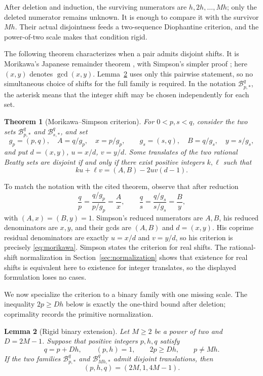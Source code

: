 \documentclass[11pt]{article}
\newtheorem{theorem}{Theorem}[section]
\newtheorem{lemma}[theorem]{Lemma}
\theoremstyle{definition}
\theoremstyle{remark}
\newcommand{\B}{\mathcal B}
\begin{document}
After deletion and induction, the surviving numerators are
\(h,2h,\ldots,Mh\); only the deleted numerator remains unknown.  It is
enough to compare it with the survivor \(Mh\).  Their actual disjointness
feeds a two-sequence Diophantine criterion, and the power-of-two scale makes
that condition rigid.

The following theorem characterizes when a pair admits disjoint
shifts.  It is Morikawa's Japanese remainder theorem
\cite[Theorem~1]{Morikawa1985}, with Simpson's simpler proof
\cite[Theorem~8]{Simpson2004}; here \((x,y)\) denotes \(\gcd(x,y)\).
Lemma~\ref{lem:rigid-extension} uses only this pairwise statement, so no
simultaneous choice of shifts for the full family is required.
In the notation \(\B^q_{p,*}\), the asterisk means that the integer shift may
be chosen independently for each set.

\begin{theorem}[Morikawa--Simpson criterion]\label{thm:morikawa}
For \(0<p,s<q\), consider the two sets \(\B^q_{p,*}\) and
\(\B^q_{s,*}\), and set
\[
 g_p=(p,q),\quad A=q/g_p,\quad x=p/g_p,
 \qquad g_s=(s,q),\quad B=q/g_s,\quad y=s/g_s,
\]
and put \(d=(x,y)\), \(u=x/d\), \(v=y/d\).  Some translates of the two
rational Beatty sets are disjoint if and only if there exist positive
integers \(k,\ell\) such that
\begin{equation}\label{eq:morikawa}
 ku+\ell v=(A,B)-2uv(d-1).
\end{equation}
\end{theorem}

To match the notation with the cited theorem, observe that after reduction
\[
 \frac qp=\frac{q/g_p}{p/g_p}=\frac Ax,
 \qquad
 \frac qs=\frac{q/g_s}{s/g_s}=\frac By,
\]
with \((A,x)=(B,y)=1\).  Simpson's reduced numerators are \(A,B\), his
reduced denominators are \(x,y\), and their gcds are \((A,B)\) and
\(d=(x,y)\).  His coprime residual denominators are exactly
\(u=x/d\) and \(v=y/d\), so his criterion is precisely
\eqref{eq:morikawa}.
Simpson states the criterion for real shifts.  The rational-shift
normalization in Section~\ref{sec:normalization} shows that existence for
real shifts is equivalent here to existence for integer translates, so the
displayed formulation loses no cases.

We now specialize the criterion to a binary family with one missing scale.
The inequality \(2p\ge Dh\) below is exactly the one-third bound after
deletion; coprimality records the primitive normalization.

\begin{lemma}[Rigid binary extension]\label{lem:rigid-extension}
Let \(M\ge2\) be a power of two and \(D=2M-1\).  Suppose that positive
integers \(p,h,q\) satisfy
\begin{equation}\label{eq:extension-data}
 q=p+Dh,\qquad (p,h)=1,\qquad 2p\ge Dh,\qquad p\ne Mh.
\end{equation}
If the two families \(\B^q_{p,*}\) and \(\B^q_{Mh,*}\) admit disjoint
translations,
then
\[
 (p,h,q)=(2M,1,4M-1).
\]
\end{lemma}
\end{document}
